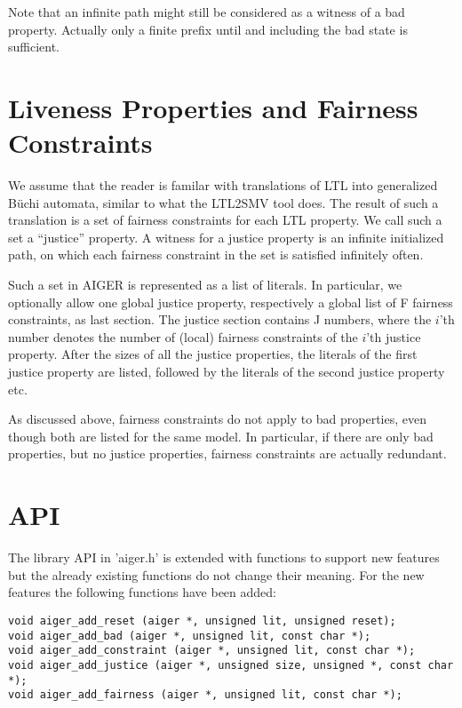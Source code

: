 \documentclass{llncs}
\begin{document}
Note that an infinite path might still be considered as a witness of a bad
property.  Actually only a finite prefix until and including the bad state
is sufficient.

\section{Liveness Properties and Fairness Constraints}

We assume that the reader is familar with translations of LTL into
generalized B\"{u}chi automata, similar to what the LTL2SMV tool does.
The result of such a translation is a set of fairness constraints for each
LTL property.  We call such a set a ``justice'' property.  A witness for a
justice property is an infinite initialized path, on which each
fairness constraint in the set is satisfied infinitely often.

Such a set in AIGER is represented as a list of literals.  In particular, we
optionally allow one global justice property, respectively a global list of
F fairness constraints, as last section.  The justice section contains J
numbers, where the $i$'th number denotes the number of (local) fairness
constraints of the $i$'th justice property.  After the sizes of all the
justice properties, the literals of the first justice property are listed,
followed by the literals of the second justice property etc.

As discussed above, fairness constraints do not apply to bad properties, even
though both are listed for the same model.  In particular, if there are only
bad properties, but no justice properties, fairness constraints are actually
redundant.

\section{API}

The library API in 'aiger.h' is extended with functions to support new
features but the already existing functions do not change their meaning.
For the new features the following functions have been added:
{\small
\begin{verbatim}
void aiger_add_reset (aiger *, unsigned lit, unsigned reset);
void aiger_add_bad (aiger *, unsigned lit, const char *);
void aiger_add_constraint (aiger *, unsigned lit, const char *);
void aiger_add_justice (aiger *, unsigned size, unsigned *, const char *);
void aiger_add_fairness (aiger *, unsigned lit, const char *);
\end{verbatim}}
\end{document}
